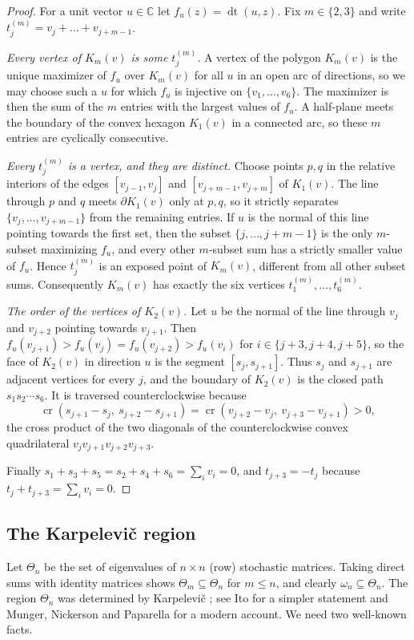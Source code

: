 \documentclass[11pt]{amsart}
\theoremstyle{definition}
\theoremstyle{remark}
\newcommand{\C}{\mathbb{C}}
\newcommand{\cross}{\operatorname{cr}}
\newcommand{\dotp}{\operatorname{dt}}
\begin{document}
\begin{proof}
For a unit vector $u\in\C$ let $f_u(z)=\dotp(u,z)$. Fix $m\in\{2,3\}$ and write $t^{(m)}_j=v_j+\dots+v_{j+m-1}$.

\emph{Every vertex of $K_m(v)$ is some $t^{(m)}_j$.} A vertex of the polygon $K_m(v)$ is the unique maximizer of $f_u$ over $K_m(v)$ for all $u$ in an open arc of directions, so we may choose such a $u$ for which $f_u$ is injective on $\{v_1,\dots,v_6\}$. The maximizer is then the sum of the $m$ entries with the largest values of $f_u$. A half-plane meets the boundary of the convex hexagon $K_1(v)$ in a connected arc, so these $m$ entries are cyclically consecutive.

\emph{Every $t^{(m)}_j$ is a vertex, and they are distinct.} Choose points $p,q$ in the relative interiors of the edges $[v_{j-1},v_j]$ and $[v_{j+m-1},v_{j+m}]$ of $K_1(v)$. The line through $p$ and $q$ meets $\partial K_1(v)$ only at $p,q$, so it strictly separates $\{v_j,\dots,v_{j+m-1}\}$ from the remaining entries. If $u$ is the normal of this line pointing towards the first set, then the subset $\{j,\dots,j+m-1\}$ is the only $m$-subset maximizing $f_u$, and every other $m$-subset sum has a strictly smaller value of $f_u$. Hence $t^{(m)}_j$ is an exposed point of $K_m(v)$, different from all other subset sums. Consequently $K_m(v)$ has exactly the six vertices $t^{(m)}_1,\dots,t^{(m)}_6$.

\emph{The order of the vertices of $K_2(v)$.} Let $u$ be the normal of the line through $v_j$ and $v_{j+2}$ pointing towards $v_{j+1}$. Then $f_u(v_{j+1})>f_u(v_j)=f_u(v_{j+2})>f_u(v_i)$ for $i\in\{j+3,j+4,j+5\}$, so the face of $K_2(v)$ in direction $u$ is the segment $[s_j,s_{j+1}]$. Thus $s_j$ and $s_{j+1}$ are adjacent vertices for every $j$, and the boundary of $K_2(v)$ is the closed path $s_1s_2\cdots s_6$. It is traversed counterclockwise because
\[
\cross(s_{j+1}-s_j,\ s_{j+2}-s_{j+1})=\cross(v_{j+2}-v_j,\ v_{j+3}-v_{j+1})>0,
\]
the cross product of the two diagonals of the counterclockwise convex quadrilateral $v_jv_{j+1}v_{j+2}v_{j+3}$.

Finally $s_1+s_3+s_5=s_2+s_4+s_6=\sum_iv_i=0$, and $t_{j+3}=-t_j$ because $t_j+t_{j+3}=\sum_iv_i=0$.
\end{proof}

\subsection{The Karpelevi\v{c} region}
Let $\Theta_n$ be the set of eigenvalues of $n\times n$ (row) stochastic matrices. Taking direct sums with identity matrices shows $\Theta_m\subseteq\Theta_n$ for $m\le n$, and clearly $\omega_n\subseteq\Theta_n$. The region $\Theta_n$ was determined by Karpelevi\v{c} \cite{Kar51}; see Ito \cite{Ito97} for a simpler statement and Munger, Nickerson and Paparella \cite{MNP24} for a modern account. We need two well-known facts.
\end{document}
